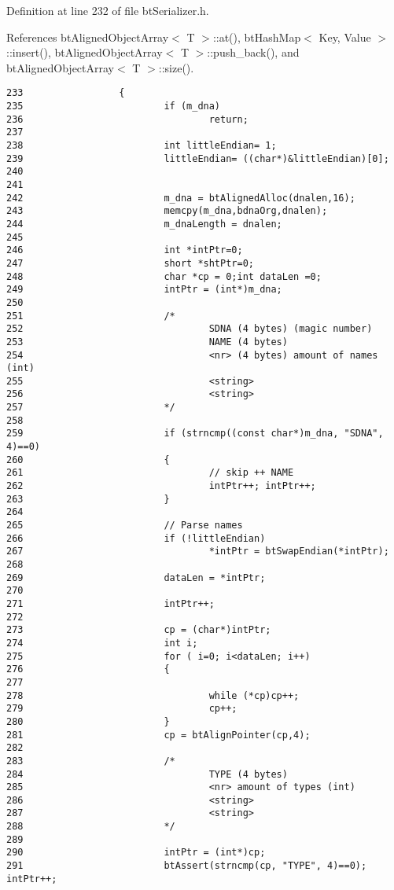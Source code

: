 Definition at line 232 of file btSerializer.h.

References btAlignedObjectArray$<$ T $>$::at(), btHashMap$<$ Key, Value $>$::insert(), btAlignedObjectArray$<$ T $>$::push\_\-back(), and btAlignedObjectArray$<$ T $>$::size().

\begin{Code}\begin{verbatim}233                 {
235                         if (m_dna)
236                                 return;
237 
238                         int littleEndian= 1;
239                         littleEndian= ((char*)&littleEndian)[0];
240 
241 
242                         m_dna = btAlignedAlloc(dnalen,16);
243                         memcpy(m_dna,bdnaOrg,dnalen);
244                         m_dnaLength = dnalen;
245 
246                         int *intPtr=0;
247                         short *shtPtr=0;
248                         char *cp = 0;int dataLen =0;
249                         intPtr = (int*)m_dna;
250 
251                         /*
252                                 SDNA (4 bytes) (magic number)
253                                 NAME (4 bytes)
254                                 <nr> (4 bytes) amount of names (int)
255                                 <string>
256                                 <string>
257                         */
258 
259                         if (strncmp((const char*)m_dna, "SDNA", 4)==0)
260                         {
261                                 // skip ++ NAME
262                                 intPtr++; intPtr++;
263                         }
264 
265                         // Parse names
266                         if (!littleEndian)
267                                 *intPtr = btSwapEndian(*intPtr);
268 
269                         dataLen = *intPtr;
270 
271                         intPtr++;
272 
273                         cp = (char*)intPtr;
274                         int i;
275                         for ( i=0; i<dataLen; i++)
276                         {
277 
278                                 while (*cp)cp++;
279                                 cp++;
280                         }
281                         cp = btAlignPointer(cp,4);
282 
283                         /*
284                                 TYPE (4 bytes)
285                                 <nr> amount of types (int)
286                                 <string>
287                                 <string>
288                         */
289 
290                         intPtr = (int*)cp;
291                         btAssert(strncmp(cp, "TYPE", 4)==0); intPtr++;

\end{verbatim}
\end{Code}
